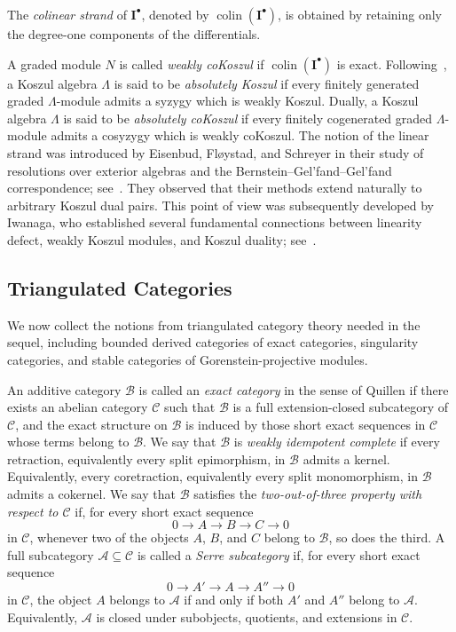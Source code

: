 \documentclass[11pt]{article}
\theoremstyle{definition}
\theoremstyle{remark}
\begin{document}
The \emph{colinear strand} of \(\mathbf{I}^{\bullet}\), denoted by
\(\operatorname{colin}(\mathbf{I}^{\bullet})\), is obtained by retaining only the degree-one components of the differentials.

A graded module \(N\) is called \emph{weakly coKoszul} if \(\operatorname{colin}(\mathbf{I}^{\bullet})\) is exact. Following~\cite{23}, a Koszul algebra \(\Lambda\) is said to be \emph{absolutely Koszul} if every finitely generated graded \(\Lambda\)-module admits a syzygy which is weakly Koszul. Dually, a Koszul algebra \(\Lambda\) is said to be \emph{absolutely coKoszul} if every finitely cogenerated graded \(\Lambda\)-module admits a cosyzygy which is weakly coKoszul. The notion of the linear strand was introduced by Eisenbud, Fl{\o}ystad, and Schreyer in their study of resolutions over exterior algebras and the Bernstein--Gel'fand--Gel'fand correspondence; see~\cite{17}. They observed that their methods extend naturally to arbitrary Koszul dual pairs. This point of view was subsequently developed by Iwanaga, who established several fundamental connections between linearity defect, weakly Koszul modules, and Koszul duality; see~\cite{41,42}.
\subsection{Triangulated Categories}
We now collect the notions from triangulated category theory needed in the sequel, including bounded derived categories of exact categories, singularity categories, and stable categories of Gorenstein-projective modules.

\medskip 

An additive category \(\mathcal{B}\) is called an \emph{exact category} in the sense of Quillen if there exists an abelian category \(\mathcal{C}\) such that \(\mathcal{B}\) is a full extension-closed subcategory of \(\mathcal{C}\), and the exact structure on \(\mathcal{B}\) is induced by those short exact sequences in \(\mathcal{C}\) whose terms belong to \(\mathcal{B}\). We say that \(\mathcal{B}\) is \emph{weakly idempotent complete} if every retraction, equivalently every split epimorphism, in \(\mathcal{B}\) admits a kernel. Equivalently, every coretraction, equivalently every split monomorphism, in \(\mathcal{B}\) admits a cokernel. We say that \(\mathcal{B}\) satisfies the \emph{two-out-of-three property with respect to \(\mathcal{C}\)} if, for every short exact sequence \[ 0 \longrightarrow A \longrightarrow B \longrightarrow C \longrightarrow 0 \] in \(\mathcal{C}\), whenever two of the objects \(A\), \(B\), and \(C\) belong to \(\mathcal{B}\), so does the third. A full subcategory \(\mathcal{A}\subseteq\mathcal{C}\) is called a \emph{Serre subcategory} if, for every short exact sequence \[ 0 \longrightarrow A' \longrightarrow A \longrightarrow A'' \longrightarrow 0 \] in \(\mathcal{C}\), the object \(A\) belongs to \(\mathcal{A}\) if and only if both \(A'\) and \(A''\) belong to \(\mathcal{A}\). Equivalently, \(\mathcal{A}\) is closed under subobjects, quotients, and extensions in \(\mathcal{C}\). 
\end{document}
